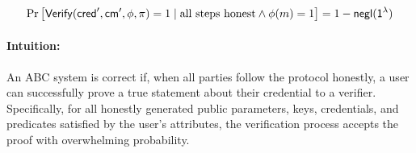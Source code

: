 \begin{definition}[Correctness]
    \[
        \Pr \left[ 
            \mathsf{Verify}(\mathsf{cred}', \mathsf{cm}', \phi, \pi) = 1 \mid \text{all steps honest} \wedge \phi(m) = 1
        \right] = 1 - \mathsf{negl}(\mathsf{1^{\lambda}})
    \]
\end{definition}

\paragraph{Intuition:} An ABC system is correct if, when all parties follow the protocol honestly, a user can successfully prove a true statement about their credential to a verifier. Specifically, for all honestly generated public parameters, keys, credentials, and predicates satisfied by the user's attributes, the verification process accepts the proof with overwhelming probability.

